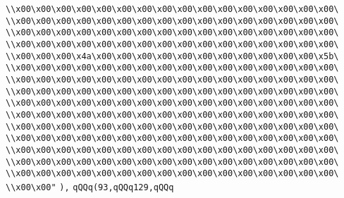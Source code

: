\verb|\\x00\x00\x00\x00\x00\x00\x00\x00\x00\x00\x00\x00\x00\x00\x00\x00\|\newline
\verb|\\x00\x00\x00\x00\x00\x00\x00\x00\x00\x00\x00\x00\x00\x00\x00\x00\|\newline
\verb|\\x00\x00\x00\x00\x00\x00\x00\x00\x00\x00\x00\x00\x00\x00\x00\x00\|\newline
\verb|\\x00\x00\x00\x00\x00\x00\x00\x00\x00\x00\x00\x00\x00\x00\x00\x00\|\newline
\verb|\\x00\x00\x00\x4a\x00\x00\x00\x00\x00\x00\x00\x00\x00\x00\x00\x5b\|\newline
\verb|\\x00\x00\x00\x00\x00\x00\x00\x00\x00\x00\x00\x00\x00\x00\x00\x00\|\newline
\verb|\\x00\x00\x00\x00\x00\x00\x00\x00\x00\x00\x00\x00\x00\x00\x00\x00\|\newline
\verb|\\x00\x00\x00\x00\x00\x00\x00\x00\x00\x00\x00\x00\x00\x00\x00\x00\|\newline
\verb|\\x00\x00\x00\x00\x00\x00\x00\x00\x00\x00\x00\x00\x00\x00\x00\x00\|\newline
\verb|\\x00\x00\x00\x00\x00\x00\x00\x00\x00\x00\x00\x00\x00\x00\x00\x00\|\newline
\verb|\\x00\x00\x00\x00\x00\x00\x00\x00\x00\x00\x00\x00\x00\x00\x00\x00\|\newline
\verb|\\x00\x00\x00\x00\x00\x00\x00\x00\x00\x00\x00\x00\x00\x00\x00\x00\|\newline
\verb|\\x00\x00\x00\x00\x00\x00\x00\x00\x00\x00\x00\x00\x00\x00\x00\x00\|\newline
\verb|\\x00\x00\x00\x00\x00\x00\x00\x00\x00\x00\x00\x00\x00\x00\x00\x00\|\newline
\verb|\\x00\x00\x00\x00\x00\x00\x00\x00\x00\x00\x00\x00\x00\x00\x00\x00\|\newline
\verb|\\x00\x00"|\newline
\verb|),|\newline
\verb|qQQq(93,qQQq129,qQQq|\newline

